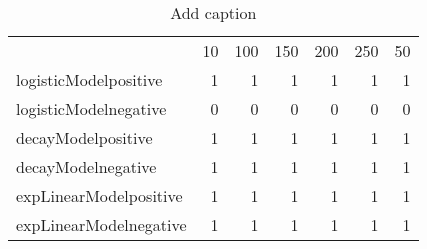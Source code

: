 \begin{table}[htbp]
  \centering
  \caption{Add caption}
    \begin{tabular}{lrrrrrr}
          & 10    & 100   & 150   & 200   & 250   & 50 \\
    logisticModelpositive & 1     & 1     & 1     & 1     & 1     & 1 \\
    logisticModelnegative & 0     & 0     & 0     & 0     & 0     & 0 \\
    decayModelpositive & 1     & 1     & 1     & 1     & 1     & 1 \\
    decayModelnegative & 1     & 1     & 1     & 1     & 1     & 1 \\
    expLinearModelpositive & 1     & 1     & 1     & 1     & 1     & 1 \\
    expLinearModelnegative & 1     & 1     & 1     & 1     & 1     & 1 \\
    \end{tabular}%
  \label{tab:addlabel}%
\end{table}%
